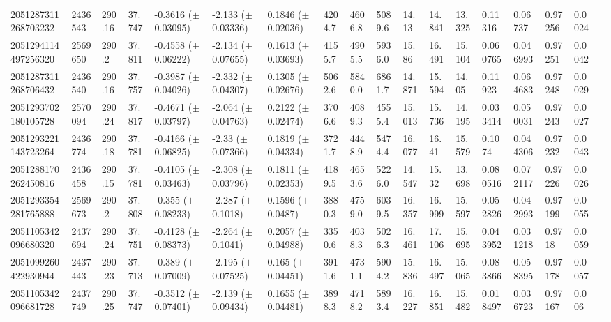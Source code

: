 \begin{sidewaystable}[htbp]
{\begin{tabular}{llllllllllllllllll}
            2051287311268703232 & 2436543 & 290.16 & 37.747 & -0.3616 ($\pm$ 0.03095) & -2.133 ($\pm$ 0.03336) & 0.1846 ($\pm$ 0.02036) & 4204.7 & 4606.8 & 5089.6 & 14.13 & 14.841 & 13.325 & 0.11316 & 0.06737 & 0.97256 & 0.0024 & \\
            2051294114497256320 & 2569650 & 290.2 & 37.811 & -0.4558 ($\pm$ 0.06222) & -2.134 ($\pm$ 0.07655) & 0.1613 ($\pm$ 0.03693) & 4155.7 & 4905.5 & 5936.0 & 15.86 & 16.491 & 15.104 & 0.060765 & 0.046993 & 0.97251 & 0.0042 & \\
            2051287311268706432 & 2436540 & 290.16 & 37.757 & -0.3987 ($\pm$ 0.04026) & -2.332 ($\pm$ 0.04307) & 0.1305 ($\pm$ 0.02676) & 5062.6 & 5840.0 & 6861.7 & 14.871 & 15.594 & 14.05 & 0.11923 & 0.064683 & 0.97248 & 0.0029 & \\
            2051293702180105728 & 2570094 & 290.24 & 37.817 & -0.4671 ($\pm$ 0.03797) & -2.064 ($\pm$ 0.04763) & 0.2122 ($\pm$ 0.02474) & 3706.6 & 4089.3 & 4555.4 & 15.013 & 15.736 & 14.195 & 0.033414 & 0.050031 & 0.97243 & 0.0027 & \\
            2051293221143723264 & 2436774 & 290.18 & 37.781 & -0.4166 ($\pm$ 0.06825) & -2.33 ($\pm$ 0.07366) & 0.1819 ($\pm$ 0.04334) & 3721.7 & 4448.9 & 5474.4 & 16.077 & 16.41 & 15.579 & 0.1074 & 0.044306 & 0.97232 & 0.0043 & \\
            2051288170262450816 & 2436458 & 290.15 & 37.781 & -0.4105 ($\pm$ 0.03463) & -2.308 ($\pm$ 0.03796) & 0.1811 ($\pm$ 0.02353) & 4189.5 & 4653.6 & 5226.0 & 14.547 & 15.32 & 13.698 & 0.080516 & 0.072117 & 0.97226 & 0.0026 & \\
            2051293354281765888 & 2569673 & 290.2 & 37.808 & -0.355 ($\pm$ 0.08233) & -2.287 ($\pm$ 0.1018) & 0.1596 ($\pm$ 0.0487) & 3880.3 & 4759.0 & 6039.5 & 16.357 & 16.999 & 15.597 & 0.052826 & 0.042993 & 0.97199 & 0.0055 & \\
            2051105342096680320 & 2437694 & 290.24 & 37.751 & -0.4128 ($\pm$ 0.08373) & -2.264 ($\pm$ 0.1041) & 0.2057 ($\pm$ 0.04988) & 3350.6 & 4038.3 & 5026.3 & 16.461 & 17.106 & 15.695 & 0.043952 & 0.031218 & 0.9718 & 0.0059 & \\
            2051099260422930944 & 2437443 & 290.23 & 37.713 & -0.389 ($\pm$ 0.07009) & -2.195 ($\pm$ 0.07525) & 0.165 ($\pm$ 0.04451) & 3911.6 & 4731.1 & 5904.2 & 15.836 & 16.497 & 15.065 & 0.083866 & 0.058395 & 0.97178 & 0.0057 & \\
            2051105342096681728 & 2437749 & 290.25 & 37.747 & -0.3512 ($\pm$ 0.07401) & -2.139 ($\pm$ 0.09434) & 0.1655 ($\pm$ 0.04481) & 3898.3 & 4718.2 & 5893.4 & 16.227 & 16.851 & 15.482 & 0.018497 & 0.036723 & 0.97167 & 0.006 & \\

\end{tabular}}
\end{sidewaystable}
